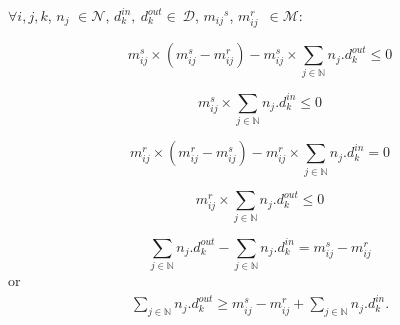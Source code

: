 

    $\forall i, j, k$, ${n_{j}}$  $\in \mathcal{N}$, $d_k^{in},~d_k^{out}\in~\mathcal{D}$, ${m_{ij}}^{s}$, $m_{ij}^{r}$~$\in\mathcal{M} $:\newline

	\begin{equation}
		 {m_{ij}^{s}} \times ({m_{ij}^{s}} - m_{ij}^{r}) - {m_{ij}^{s}} \times \sum_{j \in \mathbb{N} } n_{j}.d_{k}^{out} \leq 0 
		\label{eqm1} 
	\end{equation}
	
	\begin{equation}%
		 {m_{ij}^{s}} \times \sum_{j \in \mathbb{N} } n_{j}.d_{k}^{in} \leq 0 
		\label{eqm2}
	\end{equation}
	
	\begin{equation}%
		{m_{ij}^{r}} \times ({m_{ij}^{r}}  - m_{ij}^{s})  - {m_{ij}^{r}} \times \sum_{j \in \mathbb{N} } n_{j}.d_{k}^{in} = 0
		\label{eqm3}
	\end{equation}

	\begin{equation}%
		 {m_{ij}^{r}} \times \sum_{j \in \mathbb{N} } n_{j}.d_{k}^{out} \leq 0 
		\label{eqm4}
	\end{equation}
	



    \begin{equation}	
    	\sum_{j \in \mathbb{N} } n_{j}.d_k^{out} - \sum_{j \in \mathbb{N} } n_{j}.d_k^{in}  = {m_{ij}^{s}} - m_{ij}^{r}
    	\label{eqm5}
    \end{equation}
    \; \; \; \; \; \; \; \; \; \; \; \; \; \; \; \; \; \; \; \; \; \; \; \; \; \; \; \; \; \;\; \; \; \; \; \;or
    \begin{equation*}
    	\begin{split}
    	\sum_{j \in \mathbb{N} } n_{j}.d_k^{out} \geq {m_{ij}^{s}} - m_{ij}^{r} + \sum_{j \in \mathbb{N} } n_{j}.d_k^{in}.
    	\label{eqm6}
    	\end{split}		
    \end{equation*}


